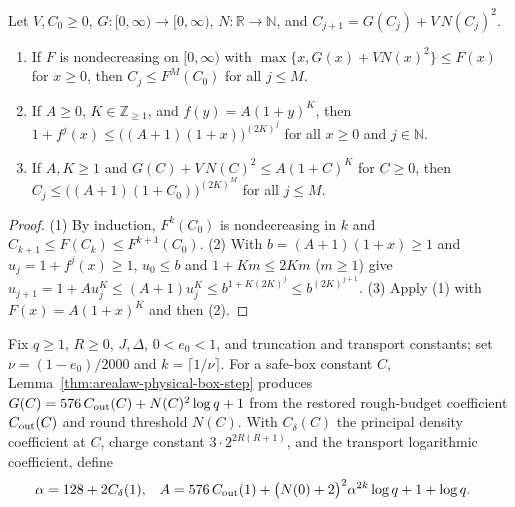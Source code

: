 \begin{lemma}
    \label{thm:area_law_bootstrap_iterate}
    \leanok
    Let $V,C_0\ge0$, $G:\lbrack0,\infty)\to\lbrack0,\infty)$, $N:\mathbb R\to\mathbb N$, and
    $C_{j+1}=G(C_j)+V\,N(C_j)^2$.
    \begin{enumerate}
        \item If $F$ is nondecreasing on $[0,\infty)$ with $\max\{x,G(x)+VN(x)^2\}\le F(x)$ for $x\ge0$, then $C_j\le F^{M}(C_0)$ for all $j\le M$.
        \item If $A\ge0$, $K\in\mathbb Z_{\ge1}$, and $f(y)=A(1+y)^K$, then
              $1+f^{j}(x)\le\bigl((A+1)(1+x)\bigr)^{(2K)^j}$ for all $x\ge0$ and $j\in\mathbb N$.
        \item If $A,K\ge1$ and $G(C)+V\,N(C)^2\le A(1+C)^K$ for $C\ge0$, then
              $C_j\le\bigl((A+1)(1+C_0)\bigr)^{(2K)^M}$ for all $j\le M$.
    \end{enumerate}
\end{lemma}
\begin{proof}
    \leanok
    (1) By induction, $F^k(C_0)$ is nondecreasing in $k$ and $C_{k+1}\le F(C_k)\le F^{k+1}(C_0)$.
    (2) With $b=(A+1)(1+x)\ge1$ and $u_j=1+f^j(x)\ge1$, $u_0\le b$ and $1+Km\le2Km$ ($m\ge1$) give
    $u_{j+1}=1+Au_j^K\le(A+1)u_j^K\le b^{1+K(2K)^j}\le b^{(2K)^{j+1}}$.
    (3) Apply (1) with $F(x)=A(1+x)^K$ and then (2).
\end{proof}

\begin{definition}
    \label{def:area_law_bootstrap_step_constants}
    \leanok
    Fix $q\ge1$, $R\ge0$, $J,\Delta$, $0<e_0<1$, and truncation and
    transport constants; set $\nu=(1-e_0)/2000$ and $k=\lceil1/\nu\rceil$. For a safe-box
    constant $C$, Lemma~\ref{thm:arealaw-physical-box-step} produces
    $G(C)=576\,C_{\rm out}(C)+N(C)^2\log q+1$ from the restored rough-budget coefficient $C_{\rm out}(C)$ and round threshold $N(C)$. With $C_\delta(C)$ the principal density coefficient at $C$, charge constant $3\cdot2^{2R(R+1)}$, and the transport logarithmic coefficient, define
    \begin{align}
        \alpha & =128+2C_\delta(1),                                         &
        A      & =576\,C_{\rm out}(1)+\bigl(N(0)+2\bigr)^2\alpha^{2k}\log q
        +1+\log q.
        \label{eq:area_law_bootstrap_step_constants}
    \end{align}
\end{definition}

